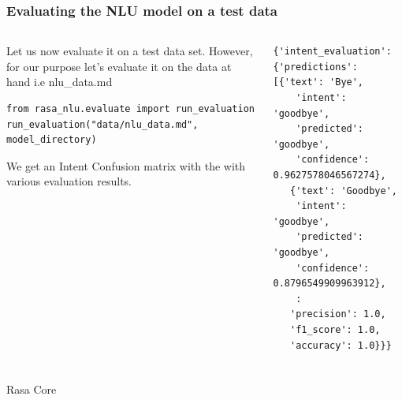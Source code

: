  \begin{frame}[fragile]\frametitle{Evaluating the NLU model on a test data}
 
    \begin{columns}
    \begin{column}[t]{0.5\linewidth}
Let us now evaluate it on a test data set. However, for our purpose let's evaluate it on the data at hand i.e nlu\_data.md
\begin{lstlisting}
from rasa_nlu.evaluate import run_evaluation
run_evaluation("data/nlu_data.md", model_directory)
\end{lstlisting}

We get an Intent Confusion matrix with the with various evaluation results.
    \end{column}
    \begin{column}[t]{0.5\linewidth}
\begin{lstlisting}
{'intent_evaluation': {'predictions': [{'text': 'Bye',
    'intent': 'goodbye',
    'predicted': 'goodbye',
    'confidence': 0.9627578046567274},
   {'text': 'Goodbye',
    'intent': 'goodbye',
    'predicted': 'goodbye',
    'confidence': 0.8796549909963912},
	:
   'precision': 1.0,
   'f1_score': 1.0,
   'accuracy': 1.0}}}
\end{lstlisting}
    \end{column}
  \end{columns}
\end{frame}

 \begin{frame}[fragile]\frametitle{}
 \begin{center}
{\Large Rasa Core}
\end{center}
\end{frame}

